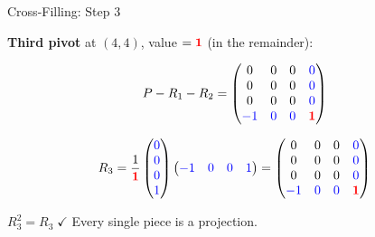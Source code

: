 \documentclass[10pt]{beamer}
\theoremstyle{definition}
\newcommand{\x}[1]{\alert{\textbf{#1}}}
\newcommand{\pvt}[1]{{\color{red}\mathbf{#1}}}       %
\newcommand{\crs}[1]{{\color{blue}#1}}                %
\begin{document}
\begin{frame}{Cross-Filling: Step 3}

\x{Third pivot} at $(4,4)$, value $= \pvt{1}$ (in the remainder):

$$P - R_1 - R_2 = \begin{pmatrix} 0 & 0 & 0 & \crs{0} \\ 0 & 0 & 0 & \crs{0} \\ 0 & 0 & 0 & \crs{0} \\ \crs{-1} & \crs{0} & \crs{0} & \pvt{1} \end{pmatrix}$$

$$R_3 = \frac{1}{\pvt{1}}\begin{pmatrix} \crs{0} \\ \crs{0} \\ \crs{0} \\ \crs{1} \end{pmatrix} \begin{pmatrix} \crs{-1} & \crs{0} & \crs{0} & \crs{1} \end{pmatrix}
= \begin{pmatrix} 0 & 0 & 0 & \crs{0} \\ 0 & 0 & 0 & \crs{0} \\ 0 & 0 & 0 & \crs{0} \\ \crs{-1} & \crs{0} & \crs{0} & \pvt{1} \end{pmatrix}$$

\vspace{0.3em}

$R_3^2 = R_3 \;\checkmark$ \quad Every single piece is a projection.

\end{frame}
\end{document}
